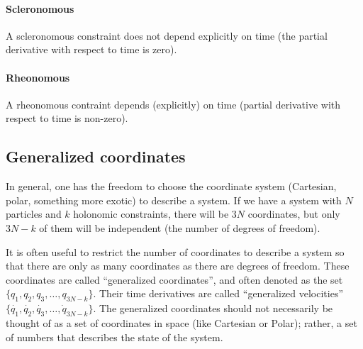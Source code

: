 \paragraph{Scleronomous}
A scleronomous constraint does not depend explicitly on time (the partial derivative with respect to time is zero).
\paragraph{Rheonomous}
A rheonomous contraint depends (explicitly) on time (partial derivative with respect to time is non-zero).

\subsection{Generalized coordinates}
In general, one has the freedom to choose the coordinate system (Cartesian, polar, something more exotic) to describe a system. If we have a system with $N$ particles and $k$ holonomic constraints, there will be $3N$ coordinates, but only $3N-k$ of them will be independent (the number of degrees of freedom). 

It is often useful to restrict the number of coordinates to describe a system so that there are only as many coordinates as there are degrees of freedom. These coordinates are called ``generalized coordinates'', and often denoted as the set  $\{q_1,q_2,q_3,\dots,q_{3N-k}\}$. Their time derivatives are called ``generalized velocities'' $\{\dot{q_1},\dot{q_2},\dot{q_3},\dots,\dot{q}_{3N-k}\}$. The generalized coordinates should not necessarily be thought of as a set of coordinates in space (like Cartesian or Polar); rather, a set of numbers that describes the state of the system. 

